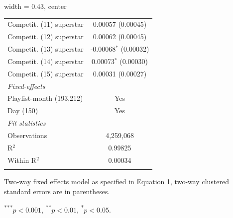 \begin{table}[htbp]
\begin{adjustbox}{width = 0.43\textwidth, center}
\begin{threeparttable}[b]
\begin{tabular}{lc}
            Competit. (11) superstar               & 0.00057 (0.00045)\\   
            Competit. (12) superstar               & 0.00062 (0.00045)\\   
            Competit. (13) superstar               & -0.00068$^{*}$ (0.00032)\\   
            Competit. (14) superstar               & 0.00073$^{*}$ (0.00030)\\   
            Competit. (15) superstar               & 0.00031 (0.00027)\\   
            \midrule
            \emph{Fixed-effects}\\
            Playlist-month (193,212)               & Yes\\  
            Day (150)                              & Yes\\  
            \midrule
            \emph{Fit statistics}\\
            Observations                           & 4,259,068\\  
            R$^2$                                  & 0.99825\\  
            Within R$^2$                           & 0.00034\\  
            \midrule \midrule & \tabularnewline
         \end{tabular}
         
         \begin{tablenotes}\footnotesize
            \item Two-way fixed effects model as specified in Equation 1, two-way clustered standard errors are in parentheses.
            \item \textsuperscript{***}$p<0.001$, 
                             \textsuperscript{**}$p<0.01$, 
                             \textsuperscript{*}$p<0.05$.
         \end{tablenotes}
      \end{threeparttable}
   \end{adjustbox}
\end{table}


